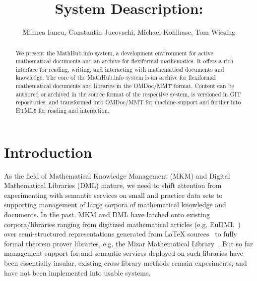 \documentclass{llncs}
\title{System Deascription: \sys}
\author{Mihnea  Iancu, Constantin Jucovschi, Michael  Kohlhase, Tom Wiesing}
\institute{
  Computer Science, Jacobs University Bremen, \url{http://kwarc.info}
}
\def\omdoc{\textsf{OMDoc}\xspace}
\def\mmt{\textsf{MMT}\xspace}
\def\sys{\textsf{MathHub.info}\xspace}
\begin{document}
\maketitle
\begin{abstract}
  We present the \sys system, a development environment for active mathematical documents
  and an archive for flexiformal mathematics. It offers a rich interface for reading,
  writing, and interacting with mathematical documents and knowledge. The core of the \sys
  system is an archive for flexiformal mathematical documents and libraries in the
  \omdoc/\mmt format. Content can be authored or archived in the source format of the
  respective system, is versioned in GIT repositories, and transformed into \omdoc/\mmt
  for machine-support and further into HTML5 for reading and interaction.
\end{abstract}

\section{Introduction}\label{sec:intro}

As the field of Mathematical Knowledge Management (MKM) and Digital Mathematical Libraries
(DML) mature, we need to shift attention from experimenting with semantic services on
small and practice data sets to supporting management of large corpora of mathematical
knowledge and documents. In the past, MKM and DML have latched onto existing
corpora/libraries ranging from digitized mathematical articles (e.g.
EuDML~\cite{EuDML:on}) over semi-structured representations generated from {\LaTeX}
sources~\cite{StaKoh:tlcspx10} to fully formal theorem prover libraries, e.g. the Mizar
Mathematical Library~\cite{MizarKB:on}.  But so far management support for and semantic
services deployed on such libraries have been essentially insular, existing cross-library
methods remain experiments, and have not been implemented into usable systems.
\end{document}
